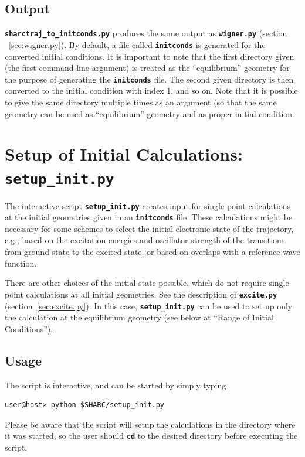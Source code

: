 \documentclass[a4paper,10pt,DIV=15,openany,twoside=false]{scrbook}
\newcommand{\ttt}[1]{\textbf{\texttt{#1}}}
\begin{document}
\subsection{Output}

\ttt{sharctraj\_to\_initconds.py} produces the same output as \ttt{wigner.py} (section ~\ref{sec:wigner.py}).
By default, a file called \ttt{initconds} is generated for the converted initial conditions. 
It is important to note that the first directory given (the first command line argument) is treated as the ``equilibrium'' geometry for the purpose of generating the \ttt{initconds} file.
The second given directory is then converted to the initial condition with index 1, and so on.
Note that it is possible to give the same directory multiple times as an argument (so that the same geometry can be used as ``equilibrium'' geometry and as proper initial condition.



\section{Setup of Initial Calculations: \ttt{setup\_init.py}}\label{sec:setup_init.py}

The interactive script \ttt{setup\_init.py} creates input for single point calculations at the initial geometries given in an \ttt{initconds} file. These calculations might be necessary for some schemes to select the initial electronic state of the trajectory, e.g., based on the excitation energies and oscillator strength of the transitions from ground state to the excited state, or based on overlaps with a reference wave function. 

There are other choices of the initial state possible, which do not require single point calculations at all initial geometries. See the description of \ttt{excite.py} (section~\ref{sec:excite.py}). In this case, \ttt{setup\_init.py} can be used to set up only the calculation at the equilibrium geometry (see below at ``Range of Initial Conditions'').

\subsection{Usage}

The script is interactive, and can be started by simply typing 
\begin{verbatim}
user@host> python $SHARC/setup_init.py
\end{verbatim}
Please be aware that the script will setup the calculations in the directory where it was started, so the user should \ttt{cd} to the desired directory before executing the script.
\end{document}
